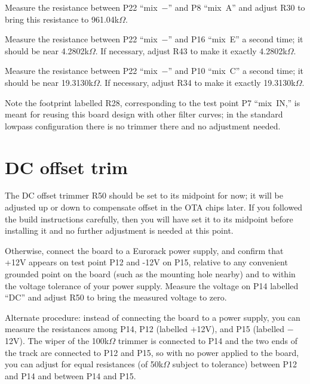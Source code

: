 Measure the resistance between P22 ``mix~$-$'' and P8 ``mix~A'' and adjust
R30 to bring this resistance to 961.04k$\Omega$.

Measure the resistance between P22 ``mix~$-$'' and P16 ``mix~E'' a second
time; it should be near 4.2802k$\Omega$.  If necessary, adjust
R43 to make it exactly 4.2802k$\Omega$.

Measure the resistance between P22 ``mix~$-$'' and P10 ``mix~C'' a second
time; it should be near 19.3130k$\Omega$.  If necessary, adjust
R34 to make it exactly 19.3130k$\Omega$.

Note the footprint labelled R28, corresponding to the test point P7
``mix~IN,'' is meant for reusing this board design with other filter curves;
in the standard lowpass configuration there is no trimmer there and no
adjustment needed.

\section{DC offset trim}

The DC offset trimmer R50 should be set to its midpoint for now; it
will be adjusted up or down to compensate offset in the OTA chips later.
If you followed the build instructions carefully, then you will have set it
to its midpoint before installing it and no further adjustment is needed at
this point.

Otherwise, connect the board to a Eurorack power supply, and confirm that
+12V appears on test point P12 and -12V on P15, relative to any convenient
grounded point on the board (such as the mounting hole nearby) and to within
the voltage tolerance of your power supply.  Measure the voltage on P14
labelled ``DC'' and adjust R50 to bring the measured voltage to zero.

Alternate procedure:  instead of connecting the board to a power supply, you
can measure the resistances among P14, P12 (labelled $+$12V), and P15
(labelled $-$12V).  The wiper of the 100k$\Omega$ trimmer is connected to
P14 and the two ends of the track are connected to P12 and P15, so with no
power applied to the board, you can adjust for equal resistances (of
50k$\Omega$ subject to tolerance) between P12 and P14 and between P14 and
P15.
